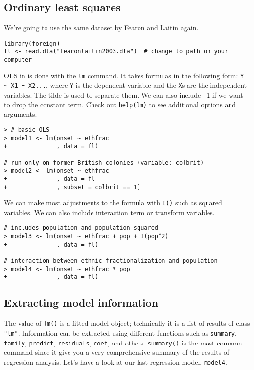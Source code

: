 \subsection{Ordinary least squares}

We're going to use the same dataset by Fearon and Laitin again.

\begin{lstlisting}
library(foreign)
fl <- read.dta("fearonlaitin2003.dta")  # change to path on your computer
\end{lstlisting}

OLS in \R is done with the \texttt{lm} command. It takes formulas in the following form: \verb|Y ~ X1 + X2...|, where \texttt{Y} is the dependent variable and the \texttt{X}s are the independent variables. The tilde is used to separate them. We can also include \texttt{-1} if we want to drop the constant term. Check out \texttt{help(lm)} to see additional options and arguments.

\begin{lstlisting}
> # basic OLS
> model1 <- lm(onset ~ ethfrac
+              , data = fl)

# run only on former British colonies (variable: colbrit)
> model2 <- lm(onset ~ ethfrac
+              , data = fl
+              , subset = colbrit == 1)
\end{lstlisting}

We can make most adjustments to the formula with \texttt{I()} such as squared variables. We can also include interaction term or transform variables.

\begin{lstlisting}
# includes population and population squared
> model3 <- lm(onset ~ ethfrac + pop + I(pop^2)
+              , data = fl)

# interaction between ethnic fractionalization and population
> model4 <- lm(onset ~ ethfrac * pop
+              , data = fl)
\end{lstlisting}

\subsection{Extracting model information}

The value of \texttt{lm()} is a fitted model object; technically it is a list of results of class \texttt{"lm"}. Information can be extracted using different functions such as \texttt{summary}, \texttt{family}, \texttt{predict}, \texttt{residuals}, \texttt{coef}, and others. \texttt{summary()} is the most common command since it give you a very comprehensive summary of the results of regression analysis. Let's have a look at our last regression model, \texttt{model4}.

